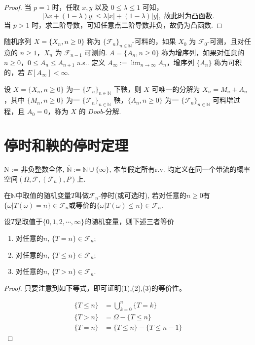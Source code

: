 \documentclass[lang=cn,10pt,thmcnt=section]{elegantbook}
\begin{document}
\begin{proof}
	当 $p = 1$ 时，任取 $x, y$ 以及 $0 \leq \lambda \leq 1$ 可知，
\[
|\lambda x + (1 - \lambda)y| \leq \lambda |x| + (1 - \lambda)|y|, \text{ 故此时为凸函数.}
\]
当 $p > 1$ 时，求二阶导数，可知任意点二阶导数非负，故仍为凸函数.
\end{proof}
\begin{definition}
	随机序列 $X = \{X_n, n \geq 0\}$ 称为 $\{\mathcal{F}_n\}_{n \in \mathbb{N}}$-可料的，如果 $X_0$ 为 $\mathcal{F}_0$-可测，且对任意的 $n \geq 1$，$X_n$ 为 $\mathcal{F}_{n-1}$ 可测的. 
$A = \{A_n, n \geq 0\}$ 称为增序列，如果对任意的 $n \geq 0$，$0 \leq A_n \leq A_{n+1}$ a.s.. 定义 $A_\infty := \lim_{n \to \infty} A_n$，增序列 $\{A_n\}$ 称为可积的，若 $E[A_\infty] < \infty$.

\end{definition}
\begin{theorem}
	设 $X = \{X_n, n \geq 0\}$ 为一 $\{\mathcal{F}_n\}_{n \in \mathbb{N}}$ 下鞅，则 $X$ 可唯一的分解为 $X_n = M_n + A_n$，其中 $\{M_n, n \geq 0\}$ 为一 $\{\mathcal{F}_n\}_{n \in \mathbb{N}}$ 鞅，$\{A_n, n \geq 0\}$ 为一 $\{\mathcal{F}_n\}_{n \in \mathbb{N}}$ 可料增过程，且 $A_0 = 0$，称为 $X$ 的 \textit{Doob}-分解.
\end{theorem}

\section{停时和鞅的停时定理}
N := 非负整数全体, $\overline{\mathbb{N}} := \mathbb{N} \cup \{\infty\}$, 本节假定所有r.v. 均定义在同一个带流的概率空间$(\Omega, \mathcal{F}, (\mathcal{F}_n), P)$上.
\begin{definition}
	在$\mathbb{N}$中取值的随机变量$T$叫做$\mathcal{F}_n$-停时(或可选时), 若对任意的$n \geq 0$有$\{\omega | T(\omega) = n\} \in \mathcal{F}_n$或等价的$\{\omega | T(\omega) \leq n\} \in \mathcal{F}_n$.
\end{definition}
\begin{lemma}
	设$T$是取值于$\{0, 1, 2, \cdots, \infty\}$的随机变量，则下述三者等价
\begin{enumerate}
    \item 对任意的$n$, $\{T = n\} \in \mathcal{F}_n$;
    \item 对任意的$n$, $\{T \leq n\} \in \mathcal{F}_n$;
    \item 对任意的$n$, $\{T > n\} \in \mathcal{F}_n$.
\end{enumerate}
\end{lemma}
\begin{proof}
	只要注意到如下等式，即可证明(1),(2),(3)的等价性。

\begin{align*}
\{T \leq n\} &= \bigcup_{k=0}^{n} \{T = k\} \\
\{T > n\} &= \Omega - \{T \leq n\} \\
\{T = n\} &= \{T \leq n\} - \{T \leq n-1\}
\end{align*}
\end{proof}
\end{document}
